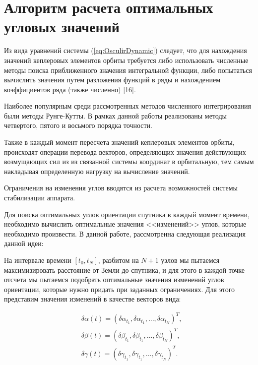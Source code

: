 \section{Алгоритм расчета оптимальных угловых значений}
\noindent\indent Из вида уравнений системы (\ref{eq:OsculirDynamic}) следует, что
для нахождения значений кеплеровых элементов орбиты требуется либо использовать численные
методы поиска приближенного значения интегральной функции, либо попытаться вычислить
значения путем разложения функций в ряды и нахождением коэффициентов ряда (также
численно) [16].\par
    Наиболее популярным среди рассмотренных методов численного интегрирования
были методы Рунге-Кутты. В рамках данной работы реализованы методы четвертого,
пятого и восьмого порядка точности.\par
    Также в каждый момент пересчета значений кеплеровых элементов орбиты, происходят
операции перевода векторов, определяющих значения действующих возмущающих сил из
из связанной системы координат в орбитальную, тем самым накладывая определенную
нагрузку на вычисление значений.\par
    Ограничения на изменения углов вводятся из расчета возможностей системы
стабилизации аппарата.\par
    Для поиска оптимальных углов ориентации спутника в каждый момент времени,
необходимо вычислить оптимальные значения <<изменений>> углов, которые необходимо
произвести. В данной работе, рассмотренна следующая реализация данной идеи:\par
    На интервале времени $[t_0, t_N]$, разбитом на $N+1$ узлов мы пытаемся максимизировать
расстояние от Земли до спутника, и для этого в каждой точке отсчета мы пытаемся подобрать
оптимальные значения изменений углов ориентации, которые нужно придать при заданных
ограничениях. Для этого представим значения изменений в качестве векторов вида:\par
\begin{equation}
    \begin{aligned}
        &\delta\alpha(t) = (\delta\alpha_{t_1}, \delta\alpha_{t_1}, ..., \delta\alpha_{t_N})^T, \\
        &\delta\beta(t) = (\delta\beta_{t_1}, \delta\beta_{t_1}, ..., \delta\beta_{t_N})^T, \\
        &\delta\gamma(t) = (\delta\gamma_{t_1}, \delta\gamma_{t_1}, ..., \delta\gamma_{t_N})^T. \\
    \end{aligned}
\end{equation}\par
